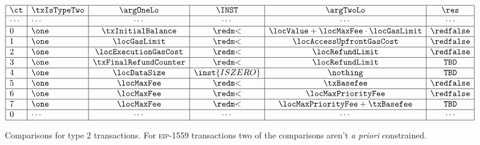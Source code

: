 \begin{figure}[!h]
	\[                                                                                                                          
	\begin{array}{|l|l|c|c|c|c|c|c|} \hline                                                                                                                      
		\ct    & \txIsTypeTwo & \argOneLo             & \INST         & \argTwoLo                                 & \res         \\ \hline
		\cdots & \cdots       & \cdots                & \cdots        & \cdots                                    & \cdots       \\ \hline
		0      & \one         & \txInitialBalance     & \locLT        & \locValue + \locMaxFee \cdot \locGasLimit & \rFaux       \\ \hline
		1      & \one         & \locGasLimit          & \locLT        & \locAccessUpfrontGasCost                  & \rFaux       \\ \hline
		2      & \one         & \locExecutionGasCost  & \locLT        & \locRefundLimit                           & \rFaux       \\ \hline
		3      & \one         & \txFinalRefundCounter & \locLT        & \locRefundLimit                           & \texttt{TBD} \\ \hline
		4      & \one         & \locDataSize          & \inst{ISZERO} & \nothing                                  & \texttt{TBD} \\ \hline
		5      & \one         & \locMaxFee            & \locLT        & \txBasefee                                & \rFaux       \\ \hline
		6      & \one         & \locMaxFee            & \locLT        & \locMaxPriorityFee                        & \rFaux       \\ \hline
		7      & \one         & \locMaxFee            & \locLT        & \locMaxPriorityFee + \txBasefee           & \texttt{TBD} \\ \hline
		0      & \cdots       & \cdots                & \cdots        & \cdots                                    & \cdots       \\ \hline
	\end{array}
	\]
	\caption{%
		Comparisons for type 2 transactions. \saNote{} For \textsc{eip-1559} transactions two of the comparisons aren't \emph{a priori} constrained.}
\end{figure}

